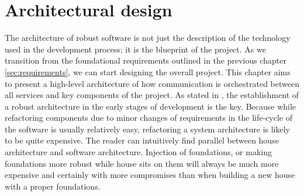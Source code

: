 \chapter{Architectural design}
\label{chap:architectural-design}

The architecture of robust software is not just the description of the technology used in the development process; it is the blueprint of the project.
As we transition from the foundational requirements outlined in the previous chapter \ref{sec:requirements}, we can start designing the overall project.
This chapter aims to present a high-level architecture of how communication is orchestrated between all services and key components of the project.
As stated in \cite{sommervilleSW}, the establishment of a robust architecture in the early stages of development is the key.
Because while refactoring components due to minor changes of requirements in the life-cycle of the software is usually relatively easy, refactoring a system architecture is likely to be quite expensive.
The reader can intuitively find parallel between house architecture and software architecture. 
Injection of foundations, or making foundations more robust while house sits on them will always be much more expensive and certainly with more compromises than when building a new house with a proper foundations.


